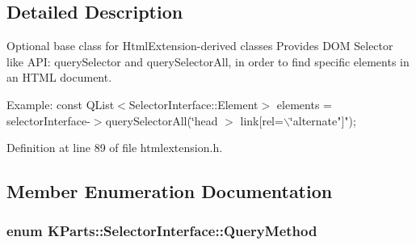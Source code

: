\subsection{\-Detailed \-Description}
\-Optional base class for \-Html\-Extension-\/derived classes \-Provides \-D\-O\-M \-Selector like \-A\-P\-I\-: query\-Selector and query\-Selector\-All, in order to find specific elements in an \-H\-T\-M\-L document.

\-Example\-: {\ttfamily  const \-Q\-List$<$\-Selector\-Interface\-::\-Element$>$ elements = selector\-Interface-\/$>$query\-Selector\-All(\char`\"{}head $>$ link\mbox{[}rel=$\backslash$\char`\"{}alternate"\mbox{]}"); } 

\-Definition at line 89 of file htmlextension.\-h.



\subsection{\-Member \-Enumeration \-Documentation}
\hypertarget{classKParts_1_1SelectorInterface_a90fe11660661a423709a52c91a969dce}{
\subsubsection[{\-Query\-Method}]{\setlength{\rightskip}{0pt plus 5cm}enum {\bf \-K\-Parts\-::\-Selector\-Interface\-::\-Query\-Method}}}\label{classKParts_1_1SelectorInterface_a90fe11660661a423709a52c91a969dce}
